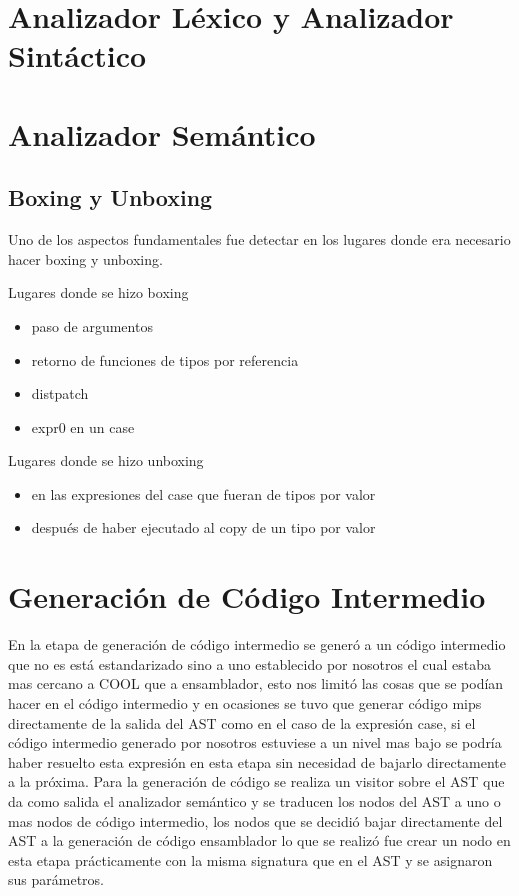 \documentclass[12pt,a4paper]{article}
\begin{document}
	\section{Analizador Léxico y Analizador Sintáctico}
	\section{Analizador Semántico}
		\subsection{Boxing y Unboxing}
			Uno de los aspectos fundamentales fue detectar en los lugares donde era necesario hacer boxing y unboxing.
			\begin{center}
				Lugares donde se hizo boxing 
			\end{center} 
			\begin{multicols}{2}
				\begin{itemize}
					\item paso de argumentos
					\item retorno de funciones de tipos por referencia
					\item distpatch
					\item expr0 en un case
				\end{itemize}
			\end{multicols}
			\begin{center}
				Lugares donde se hizo unboxing 
			\end{center} 
			\begin{multicols}{2}
				\begin{itemize}
					\item en las expresiones del case que fueran de tipos por valor
					\item después de haber ejecutado al copy de un tipo por valor
				\end{itemize}
			\end{multicols}
	\section{Generación de Código Intermedio}
		En la etapa de generación de código intermedio se generó a un código intermedio que no es está estandarizado sino a uno establecido por nosotros el cual estaba mas cercano a COOL que a ensamblador, esto nos limitó las cosas que se podían hacer en el código intermedio y en ocasiones se tuvo que generar código mips directamente de la salida del AST como en el caso de la expresión case, si el código intermedio generado por nosotros estuviese a un nivel mas bajo se podría haber resuelto esta expresión en esta etapa sin necesidad de bajarlo directamente a la próxima. Para la generación de código se realiza un visitor sobre el AST que da como salida el analizador semántico y se traducen los nodos del AST a uno o mas nodos de código intermedio, los nodos que se decidió bajar directamente del AST a la generación de código ensamblador lo que se realizó fue crear un nodo en esta etapa prácticamente con la misma signatura que en el AST y se asignaron sus parámetros.
\end{document}
